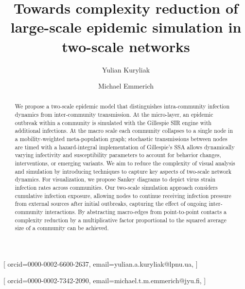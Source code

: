 \documentclass[
]{ceurart}
\begin{document}


\title{Towards complexity reduction of large-scale epidemic simulation in two-scale networks}

\author[1]{Yulian Kuryliak}[%
    orcid=0000-0002-6600-2637,
    email=yulian.a.kuryliak@lpnu.ua,
]
\cormark[1]

\author[2]{Michael Emmerich}[%
    orcid=0000-0002-7342-2090,
    email=michael.t.m.emmerich@jyu.fi,
]


\address[1]{Institute of Computer Science and Information Technologies, ICSIT of Lviv Polytechnic National University, 12 Stepan Bandera street, 79000 Lviv, Ukraine}
\address[2]{Faculty of Information Technology, University of Jyväskylä, P.O.Box 35 (Agora)
FI-40014, Finland}


\begin{abstract}
We propose a two-scale epidemic model that distinguishes intra-community infection dynamics from inter-community transmission. At the micro-layer, an epidemic outbreak within a community is simulated with the Gillespie SIR engine with additional infections. At the macro scale each community collapses to a single node in a mobility-weighted meta-population graph; stochastic transmissions between nodes are timed with a hazard-integral implementation of Gillespie’s SSA allows dynamically varying infectivity and susceptibility parameters to account for behavior changes, interventions, or emerging variants. We aim to reduce the complexity of visual analysis and simulation by introducing techniques to capture key aspects of two-scale network dynamics.
For visualization, we propose Sankey diagrams to depict virus strain infection rates across communities.
Our two-scale simulation approach considers cumulative infection exposure, allowing nodes to continue receiving infection pressure from external sources after initial outbreaks, capturing the effect of ongoing inter-community interactions. 
By abstracting macro-edges from point-to-point contacts a complexity reduction by a multiplicative factor proportional to the squared average size of a community can be achieved. %

\end{abstract}
\end{document}
